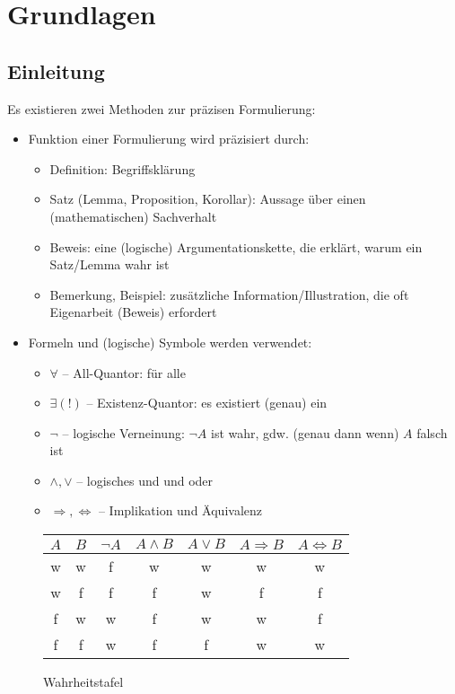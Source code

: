 \chapter{Grundlagen}
\section*{Einleitung}
	Es existieren zwei Methoden zur präzisen Formulierung:
	\begin{itemize}
	\item Funktion einer Formulierung wird präzisiert durch:
		\begin{itemize}
			\item Definition: Begriffsklärung
			\item Satz (Lemma, Proposition, Korollar): Aussage über einen (mathematischen) Sachverhalt
			\item Beweis: eine (logische) Argumentationskette, die erklärt, warum ein Satz/Lemma wahr ist
			\item Bemerkung, Beispiel: zusätzliche Information/Illustration, die oft Eigenarbeit (Beweis) erfordert
		\end{itemize}
	\item Formeln und (logische) Symbole werden verwendet:
		\begin{itemize}
			\item $\forall$ -- All-Quantor: \glqq für alle\grqq
			\item $\exists(!)$ -- Existenz-Quantor: \glqq es existiert (genau) ein\grqq
			\item $\lnot$ -- logische Verneinung: $\lnot A$ ist wahr, gdw. (genau dann wenn) $A$ falsch ist
			\item $\land ,\lor$ -- logisches \glqq und\grqq{} und \glqq oder\grqq
			\item $\Rightarrow ,\Leftrightarrow$ -- Implikation und Äquivalenz
		\end{itemize}
	\end{itemize}

	\begin{figure}[H]\centering
		\begin{tabular}{c|c|c|c|c|c|c}
			$A$ & $B$ & $\lnot A$ & $A\land B$ &$A\lor B$&$A \Rightarrow B$ & $A\Leftrightarrow B$\\\hline
			w & w & f & w & w & w & w\\
			w & f & f & f & w & f & f\\
			f & w & w & f & w & w & f\\
			f & f & w & f & f & w & w\\
		\end{tabular}
	\caption{Wahrheitstafel}
	\end{figure}

